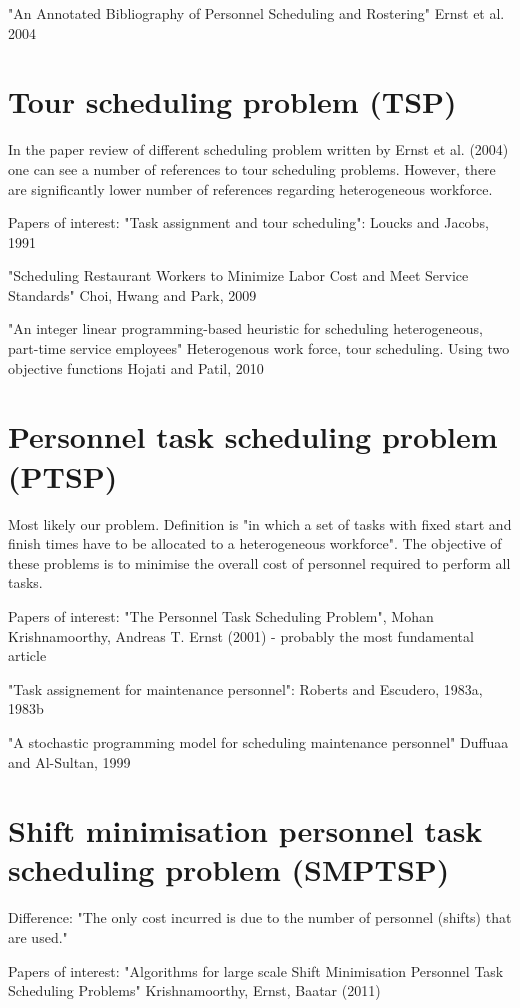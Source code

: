 "An Annotated Bibliography of Personnel Scheduling
and Rostering" Ernst et al. 2004

\section{Tour scheduling problem (TSP)}
In the paper review of different scheduling problem written by Ernst et al. (2004) one can see a number of references to tour scheduling problems. However, there are significantly lower number of references regarding heterogeneous workforce.

Papers of interest:
"Task assignment and tour scheduling": Loucks and Jacobs, 1991

"Scheduling Restaurant Workers to Minimize Labor Cost and Meet Service Standards" Choi, Hwang and Park, 2009

"An integer linear programming-based heuristic for scheduling heterogeneous, part-time service employees" Heterogenous work force, tour scheduling. Using two objective functions Hojati and Patil, 2010


\section{Personnel task scheduling problem (PTSP)}
Most likely our problem. Definition is "in which a set of tasks with fixed start and finish times have to be allocated to a heterogeneous workforce". The objective of these problems is to minimise the overall cost of personnel required to perform all tasks.

Papers of interest:
"The Personnel Task Scheduling Problem", Mohan Krishnamoorthy, Andreas T. Ernst (2001) - probably the most fundamental article

"Task assignement for maintenance personnel": Roberts and Escudero, 1983a, 1983b

"A stochastic programming model for scheduling maintenance personnel" Duffuaa and Al-Sultan, 1999

\section{Shift minimisation personnel task scheduling problem (SMPTSP)}
Difference: "The only cost incurred is due to the number of personnel (shifts) that are used."

Papers of interest:
"Algorithms for large scale Shift Minimisation Personnel Task Scheduling Problems" Krishnamoorthy, Ernst, Baatar (2011)

